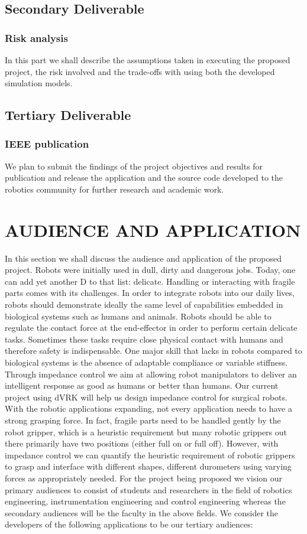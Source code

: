 \documentclass[10pt,journal,compsoc]{IEEEtran}
\begin{document}
\subsection{Secondary Deliverable}
\subsubsection{Risk analysis}
In this part we shall describe the assumptions taken in executing the proposed project, the risk involved and the trade-offs with using both the developed simulation models.

\subsection{Tertiary Deliverable}
\subsubsection{IEEE publication}
We plan to submit the findings of the project objectives and results for publication and release the application and the source code developed to the robotics community for further research and academic work.

\section{AUDIENCE AND APPLICATION}
In this section we shall discuss the audience and application of the proposed project. Robots were initially used in dull, dirty and dangerous jobs. Today, one can add yet another D to that list: delicate. Handling or interacting with fragile parts comes with its challenges. In order to integrate robots into our daily lives, robots should demonstrate ideally the same level of capabilities embedded in biological systems such as humans and animals. Robots should be able to regulate the contact force at the end-effector in order to perform certain delicate tasks. Sometimes these tasks require close physical contact with humans and therefore safety is indispensable. One major skill that lacks in robots compared to biological systems is the absence of adaptable compliance or variable stiffness. Through impedance control we aim at allowing robot manipulators to deliver an intelligent response as good as humans or better than humans. Our current project using dVRK will help us design impedance control for surgical robots. 
With the robotic applications expanding, not every application needs to have a strong grasping force. In fact, fragile parts need to be handled gently by the robot gripper, which is a heuristic requirement but many robotic grippers out there primarily have two positions (either full on or full off). However, with impedance control we can quantify the heuristic requirement of robotic grippers to grasp and interface with different shapes, different durometers using varying forces as appropriately needed.
For the project being proposed we vision our primary audiences to consist of students and researchers in the field of robotics engineering, instrumentation engineering and control engineering whereas the secondary audiences will be the faculty in the above fields. 
We consider the developers of the following applications to be our tertiary audiences:
\end{document}
